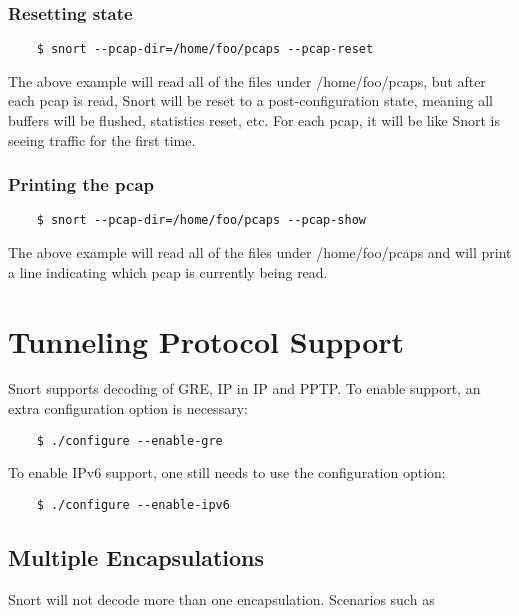 \documentclass[english]{report}
\begin{document}
\subsubsection{Resetting state}

\begin{verbatim}
    $ snort --pcap-dir=/home/foo/pcaps --pcap-reset
\end{verbatim}

The above example will read all of the files under /home/foo/pcaps, but after
each pcap is read, Snort will be reset to a post-configuration state, meaning
all buffers will be flushed, statistics reset, etc.  For each pcap, it will be
like Snort is seeing traffic for the first time.

\subsubsection{Printing the pcap}

\begin{verbatim}
    $ snort --pcap-dir=/home/foo/pcaps --pcap-show
\end{verbatim}

The above example will read all of the files under /home/foo/pcaps and will
print a line indicating which pcap is currently being read.


\section{Tunneling Protocol Support}

Snort supports decoding of GRE, IP in IP and PPTP.  To enable support, an extra
configuration option is necessary:

\begin{verbatim}
    $ ./configure --enable-gre
\end{verbatim}

To enable IPv6 support, one still needs to use the configuration option:

\begin{verbatim}
    $ ./configure --enable-ipv6
\end{verbatim}

\subsection{Multiple Encapsulations}

Snort will not decode more than one encapsulation.  Scenarios such as
\end{document}

